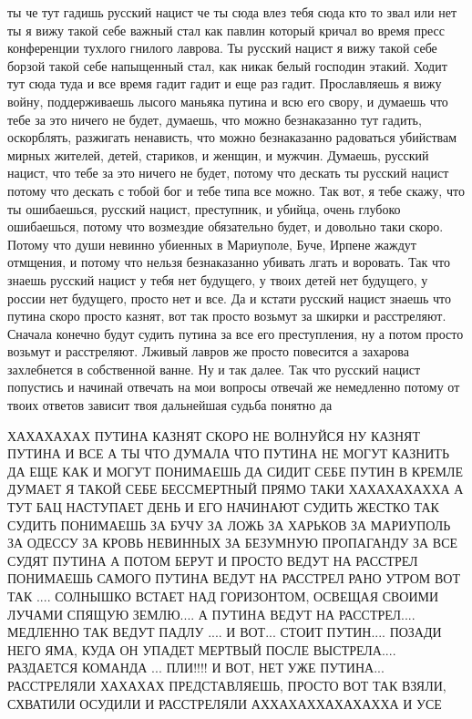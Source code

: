 ты че тут гадишь русский нацист че ты сюда влез тебя сюда кто то звал или нет
ты я вижу такой себе важный стал как павлин который кричал во время пресс
конференции тухлого гнилого лаврова. Ты русский нацист я вижу такой себе борзой
такой себе напыщенный стал, как никак белый господин этакий. Ходит тут сюда
туда и все время гадит гадит и еще раз гадит. Прославляешь я вижу войну,
поддерживаешь лысого маньяка путина и всю его свору, и думаешь что тебе за это
ничего не будет, думаешь, что можно безнаказанно тут гадить, оскорблять,
разжигать ненависть, что можно безнаказанно радоваться убийствам мирных
жителей, детей, стариков, и женщин, и мужчин. Думаешь, русский нацист, что тебе
за это ничего не будет, потому что дескать ты русский нацист потому что дескать
с тобой бог и тебе типа все можно. Так вот, я тебе скажу, что ты ошибаешься,
русский нацист, преступник, и убийца, очень глубоко ошибаешься, потому что
возмездие обязательно будет, и довольно таки скоро. Потому что души невинно
убиенных в Мариуполе, Буче, Ирпене жаждут отмщения, и потому что нельзя
безнаказанно убивать лгать и воровать. Так что знаешь русский нацист у тебя нет
будущего, у твоих детей нет будущего, у россии нет будущего, просто нет и все.
Да и кстати русский нацист знаешь что путина скоро просто казнят, вот так
просто возьмут за шкирки и расстреляют. Сначала конечно будут судить путина за
все его преступления, ну а потом просто возьмут и расстреляют. Лживый лавров же
просто повесится а захарова захлебнется в собственной ванне. Ну и так далее.
Так что русский нацист попустись и начинай отвечать на мои вопросы отвечай же
немедленно потому от твоих ответов зависит твоя дальнейшая судьба понятно да

ХАХАХАХАХ ПУТИНА КАЗНЯТ СКОРО НЕ ВОЛНУЙСЯ НУ КАЗНЯТ ПУТИНА И ВСЕ А ТЫ ЧТО
ДУМАЛА ЧТО ПУТИНА НЕ МОГУТ КАЗНИТЬ ДА ЕЩЕ КАК И МОГУТ ПОНИМАЕШЬ ДА СИДИТ СЕБЕ
ПУТИН В КРЕМЛЕ ДУМАЕТ Я ТАКОЙ СЕБЕ БЕССМЕРТНЫЙ ПРЯМО ТАКИ ХАХАХАХАХХА А ТУТ БАЦ
НАСТУПАЕТ ДЕНЬ И ЕГО НАЧИНАЮТ СУДИТЬ ЖЕСТКО ТАК СУДИТЬ ПОНИМАЕШЬ ЗА БУЧУ ЗА
ЛОЖЬ ЗА ХАРЬКОВ ЗА МАРИУПОЛЬ ЗА ОДЕССУ ЗА КРОВЬ НЕВИННЫХ ЗА БЕЗУМНУЮ ПРОПАГАНДУ
ЗА ВСЕ СУДЯТ ПУТИНА А ПОТОМ БЕРУТ И ПРОСТО ВЕДУТ НА РАССТРЕЛ ПОНИМАЕШЬ САМОГО
ПУТИНА ВЕДУТ НА РАССТРЕЛ РАНО УТРОМ ВОТ ТАК .... СОЛНЫШКО ВСТАЕТ НАД
ГОРИЗОНТОМ, ОСВЕЩАЯ СВОИМИ ЛУЧАМИ СПЯЩУЮ ЗЕМЛЮ.... А ПУТИНА ВЕДУТ НА
РАССТРЕЛ.... МЕДЛЕННО ТАК ВЕДУТ ПАДЛУ .... И ВОТ... СТОИТ ПУТИН.... ПОЗАДИ НЕГО
ЯМА, КУДА ОН УПАДЕТ МЕРТВЫЙ ПОСЛЕ ВЫСТРЕЛА.... РАЗДАЕТСЯ КОМАНДА ... ПЛИ!!!! И
ВОТ, НЕТ УЖЕ ПУТИНА... РАССТРЕЛЯЛИ ХАХАХАХ ПРЕДСТАВЛЯЕШЬ, ПРОСТО ВОТ ТАК ВЗЯЛИ,
СХВАТИЛИ ОСУДИЛИ И РАССТРЕЛЯЛИ АХХАХАХХАХАХАХХА И УСЕ

